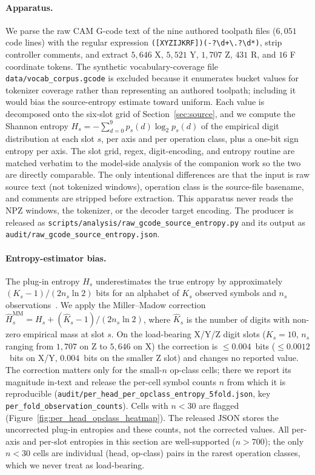\documentclass[entropy,article,submit,moreauthors,pdftex]{Definitions/mdpi}
\begin{document}
\paragraph{Apparatus.} We parse the raw CAM G-code text of the nine authored toolpath files ($6{,}051$ code lines) with the regular expression \texttt{([XYZIJKRF])(-?\textbackslash d+\textbackslash.?\textbackslash d*)}, strip controller comments, and extract $5{,}646$ X, $5{,}521$ Y, $1{,}707$ Z, $431$ R, and $16$ F coordinate tokens. The synthetic vocabulary-coverage file \texttt{data/vocab\_corpus.gcode} is excluded because it enumerates bucket values for tokenizer coverage rather than representing an authored toolpath; including it would bias the source-entropy estimate toward uniform. Each value is decomposed onto the six-slot grid of Section~\ref{sec:source}, and we compute the Shannon entropy $H_s = -\sum_{d=0}^{9} p_s(d)\log_2 p_s(d)$ of the empirical digit distribution at each slot $s$, per axis and per operation class, plus a one-bit sign entropy per axis. The slot grid, regex, digit-encoding, and entropy routine are matched verbatim to the model-side analysis of the companion work so the two are directly comparable. The only intentional differences are that the input is raw source text (not tokenized windows), operation class is the source-file basename, and comments are stripped before extraction. This apparatus never reads the NPZ windows, the tokenizer, or the decoder target encoding. The producer is released as \texttt{scripts/analysis/raw\_gcode\_source\_entropy.py} and its output as \texttt{audit/raw\_gcode\_source\_entropy.json}.

\paragraph{Entropy-estimator bias.} The plug-in entropy $H_s$ underestimates the true entropy by approximately $(K_s-1)/(2n_s\ln 2)$ bits for an alphabet of $K_s$ observed symbols and $n_s$ observations~\cite{cover_thomas,miller1955note}. We apply the Miller--Madow correction $\hat H_s^{\text{MM}} = H_s + (\hat K_s - 1)/(2 n_s \ln 2)$, where $\hat K_s$ is the number of digits with non-zero empirical mass at slot $s$. On the load-bearing X/Y/Z digit slots ($K_s=10$, $n_s$ ranging from $1{,}707$ on Z to $5{,}646$ on X) the correction is $\le\!0.004$~bits ($\le\!0.0012$~bits on X/Y, $0.004$~bits on the smaller Z slot) and changes no reported value. The correction matters only for the small-$n$ op-class cells; there we report its magnitude in-text and release the per-cell symbol counts $n$ from which it is reproducible (\texttt{audit/per\_head\_per\_opclass\_entropy\_5fold.json}, key \texttt{per\_fold\_observation\_counts}). Cells with $n<30$ are flagged (Figure~\ref{fig:per_head_opclass_heatmap}). The released JSON stores the uncorrected plug-in entropies and these counts, not the corrected values. All per-axis and per-slot entropies in this section are well-supported ($n>700$); the only $n<30$ cells are individual (head, op-class) pairs in the rarest operation classes, which we never treat as load-bearing.
\end{document}
